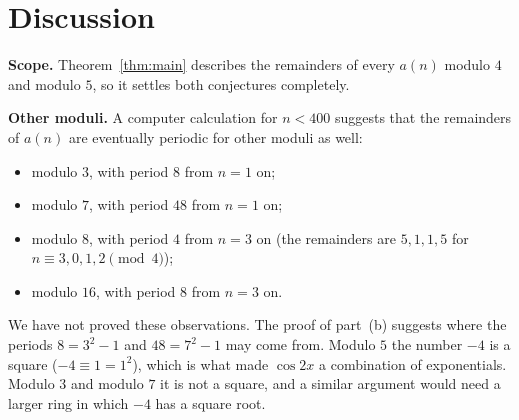 \documentclass[11pt,a4paper]{article}
\theoremstyle{definition}
\theoremstyle{remark}
\newcommand{\para}[1]{\par\medskip\noindent\textbf{#1}\enspace}
\begin{document}
\section{Discussion}\label{sec:discussion}

\para{Scope.} Theorem~\ref{thm:main} describes the remainders of every $a(n)$ modulo $4$ and modulo $5$, so it settles
both conjectures completely.

\para{Other moduli.} A computer calculation for $n<400$ suggests that the remainders of $a(n)$ are eventually periodic
for other moduli as well:
\begin{itemize}
\item modulo $3$, with period $8$ from $n=1$ on;
\item modulo $7$, with period $48$ from $n=1$ on;
\item modulo $8$, with period $4$ from $n=3$ on (the remainders are $5,1,1,5$ for $n\equiv3,0,1,2\pmod 4$);
\item modulo $16$, with period $8$ from $n=3$ on.
\end{itemize}
We have not proved these observations. The proof of part~(b) suggests where the periods $8=3^2-1$ and $48=7^2-1$ may
come from. Modulo $5$ the number $-4$ is a square ($-4\equiv1=1^2$), which is what made $\cos2x$ a combination of
exponentials. Modulo $3$ and modulo $7$ it is not a square, and a similar argument would need a larger ring in
which $-4$ has a square root.
\end{document}
